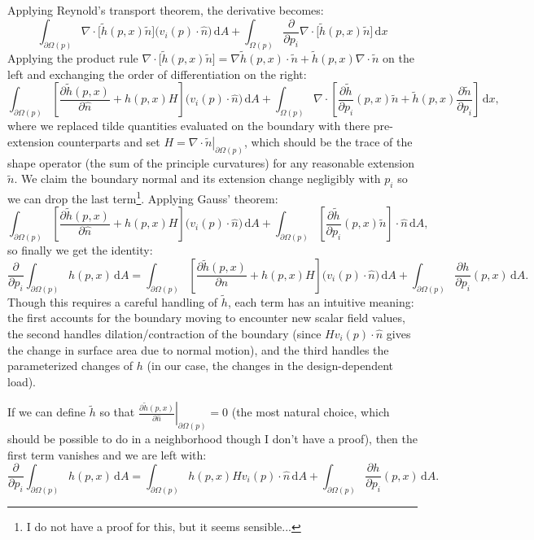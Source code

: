 \documentclass[10pt]{article}
\renewcommand{\div}{\nabla \cdot}
\providecommand{\shape}{\Omega(p)}
\providecommand{\boundary}{\partial \shape}
\providecommand{\vint}[1]{\int_{\shape} \! #1 \, \mathrm{d}x}
\providecommand{\sint}[1]{\int_{\boundary} \! #1 \, \mathrm{d}A}
\providecommand{\pder}[2]{\frac{\partial #1}{\partial #2}}
\providecommand{\evalat}[2]{\left.#1\right|_{#2}}
\begin{document}
\begin{appendices}
    Applying Reynold's transport theorem, the derivative becomes:
    $$
    \sint{\div \big[\tilde{h}(p, x)\tilde{n} \big] \big( v_i(p) \cdot \hat{n} \big)}
+ \vint{\pder{}{p_i} \div \big[\tilde{h}(p, x)\tilde{n} \big]}
    $$
    Applying the product rule $\div \big[\tilde{h}(p, x)\tilde{n} \big] =
    \nabla \tilde{h}(p, x) \cdot \tilde{n} + \tilde{h}(p, x)\div \tilde{n}$ on
    the left and exchanging the order of differentiation on the right:
    $$
    \sint{\left[\pder{\tilde{h}(p, x)}{\hat{n}} + h(p, x) H \right]\big(v_i(p) \cdot \hat{n}\big)}
    + \vint{\div \left[\pder{\tilde{h}}{p_i}(p, x)\tilde{n} + \tilde{h}(p, x) \pder{\tilde{n}}{p_i} \right]},
    $$
    where we replaced tilde quantities evaluated on the boundary with there
    pre-extension counterparts and set $H = \evalat{\div \tilde{n}}{\boundary}$,
    which should be the trace of the shape operator (the sum of the principle
    curvatures) for any reasonable extension $\tilde{n}$. We claim the
    boundary normal and its extension change negligibly with $p_i$ so we can
    drop the last term\footnote{I do not have a proof for this, but it seems
    sensible...}. Applying Gauss' theorem:
    $$
    \sint{\left[\pder{\tilde{h}(p, x)}{\hat{n}} + h(p, x) H \right]\big(v_i(p) \cdot \hat{n}\big)}
    + \sint{\left[\pder{\tilde{h}}{p_i}(p, x)\tilde{n}\right] \cdot \hat{n}},
    $$
    so finally we get the identity:
    \begin{equation}
     \pder{}{p_i} \sint{h(p, x)} =
        \sint{\left[\pder{\tilde{h}(p, x)}{\hat{n}} + h(p, x) H \right]\big(v_i(p) \cdot \hat{n}\big)}
        + \sint{\pder{h}{p_i}(p, x)}.
        \label{eqn:surface_derivative}
    \end{equation}
    Though this requires a careful handling of $\tilde{h}$, each term has an
    intuitive meaning: the first accounts for the boundary moving to encounter
    new scalar field values, the second handles dilation/contraction of the
    boundary (since $H v_i(p) \cdot \hat{n}$ gives the change in surface area due to
    normal motion), and the third handles the parameterized changes of $h$ (in
    our case, the changes in the design-dependent load).

    If we can define $\tilde{h}$ so that $\evalat{\pder{\tilde{h}(p, x)}{\hat{n}}}{\boundary} = 0$
    (the most natural choice, which should be possible to do in a
    neighborhood though I don't have a proof), then the first term
    vanishes and we are left with:
    \begin{equation}
     \pder{}{p_i} \sint{h(p, x)} =
     \sint{h(p, x) H v_i(p) \cdot \hat{n}}
        + \sint{\pder{h}{p_i}(p, x)}.
        \label{eqn:surface_derivative_simple}
    \end{equation}
\end{appendices}


\end{document}
